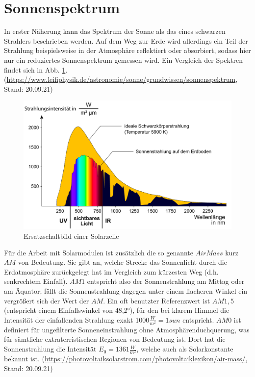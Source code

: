  \section{Sonnenspektrum}
 
 In erster Näherung kann das Spektrum der Sonne als das eines schwarzen Strahlers beschrieben werden. Auf dem Weg zur Erde wird allerdings 
 ein Teil der Strahlung beispielsweise in der Atmosphäre reflektiert oder absorbiert, sodass hier nur ein reduziertes Sonnenspektrum 
 gemessen wird. Ein Vergleich der Spektren findet sich in Abb. \ref{bild:Sonnenspektrum}. 
 (\url{https://www.leifiphysik.de/astronomie/sonne/grundwissen/sonnenspektrum}, Stand: 20.09.21)

 \clearpage
 
 \begin{figure}[h]
    \centering
    \includegraphics[scale=0.5]{Bilder/Sonnenspektrum.png}
    \caption{Ersatzschaltbild einer Solarzelle \protect \footnotemark}
    \label{bild:Sonnenspektrum}
\end{figure}



Für die Arbeit mit Solarmodulen ist zusätzlich die so genannte $Air Mass$ kurz $AM$ von Bedeutung. Sie gibt an, welche Strecke das 
Sonnenlicht durch die Erdatmosphäre zurückgelegt hat im Vergleich zum kürzesten Weg (d.h. senkrechtem Einfall). $AM1$ entspricht also 
der Sonnenstrahlung am Mittag oder am Äquator; fällt die Sonnenstrahlung dagegen unter einem flacheren Winkel ein vergrößert sich der 
Wert der $AM$. Ein oft benutzter Referenzwert ist $AM1,5$ (entspricht einem Einfallswinkel von 48,2°), für den bei klarem Himmel die 
Intensität der einfallenden Strahlung exakt 1000$\frac{W}{m^2}=1sun$ entspricht. $AM0$ ist definiert für ungefilterte Sonneneinstrahlung 
ohne Atmosphärenduchquerung, was für sämtliche extraterristischen Regionen von Bedeutung ist. Dort hat die Sonnenstrahlung die Intensität 
$E_0=1361 \frac{W}{m^2}$, welche auch als Solarkonstante bekannt ist.
(\url{https://photovoltaiksolarstrom.com/photovoltaiklexikon/air-mass/}, Stand: 20.09.21)
